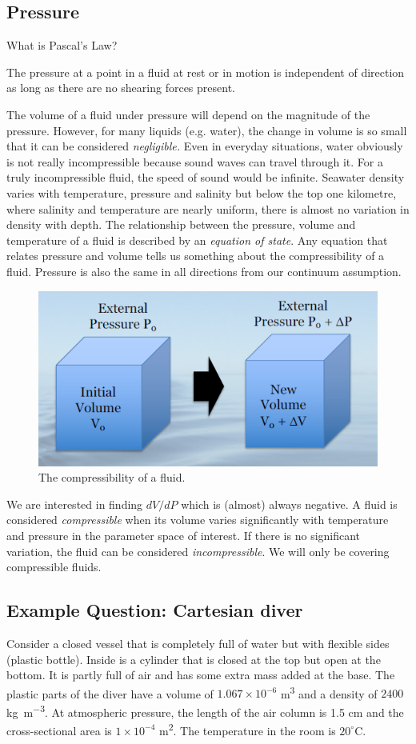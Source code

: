 \documentclass[class=report, crop=false, 12pt,a4paper]{standalone}
\numberwithin{equation}{section}
\begin{document}
\subsection{Pressure}
What is Pascal's Law?
\begin{center}
  The pressure at a point in a fluid at rest or in motion is independent of direction as long as there are no shearing forces present.
\end{center}
The volume of a fluid under pressure will depend on the magnitude of the pressure. However, for many liquids (e.g. water), the change in volume is so small that it can be considered \emph{negligible.} Even in everyday situations, water obviously is not really incompressible because sound waves can travel through it. For a truly incompressible fluid, the speed of sound would be infinite. Seawater density varies with temperature, pressure and salinity but below the top one kilometre, where salinity and temperature are nearly uniform, there is almost no variation in density with depth. The relationship between the pressure, volume and temperature of a fluid is described by an \emph{equation of state}. Any equation that relates pressure and volume tells us something about the compressibility of a fluid. Pressure is also the same in all directions from our continuum assumption.
\begin{figure}[h!]
  \centering
  \includegraphics[width = 0.8 \textwidth]{../img/CompressibilityOfFluid}
  \caption{The compressibility of a fluid.}
\end{figure}
We are interested in finding \( dV/dP\) which is (almost) always negative. A fluid is considered \emph{compressible} when its volume varies significantly with temperature and pressure in the parameter space of interest. If there is no significant variation, the fluid can be considered \emph{incompressible}. We will only be covering compressible fluids.
\subsection{Example Question: Cartesian diver}
Consider a closed vessel that is completely full of water but with flexible sides (plastic bottle). Inside is a cylinder that is closed at the top but open at the bottom. It is partly full of air and has some extra mass added at the base. The plastic parts of the diver have a volume of \(1.067\times 10^{-6} \) \si{\meter\cubed} and a density of \(2400\) \si{\kg\per\meter\cubed}. At atmospheric pressure, the length of the air column is 1.5 \si{\cm} and the cross-sectional area is \(1\times 10^{-4}\) \si{\meter\squared}. The temperature in the room is \(20^{\circ}\)C. 
\end{document}
